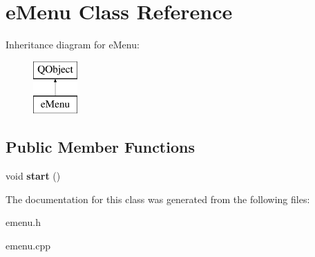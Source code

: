 \hypertarget{classe_menu}{}\section{e\+Menu Class Reference}
\label{classe_menu}
Inheritance diagram for e\+Menu\+:\begin{figure}[H]
\begin{center}
\leavevmode
\includegraphics[height=2.000000cm]{classe_menu}
\end{center}
\end{figure}
\subsection*{Public Member Functions}
\begin{DoxyCompactItemize}
\item 
void {\bfseries start} ()\hypertarget{classe_menu_aaf3437a2ac8b478cc955f5baf47edef8}{}\label{classe_menu_aaf3437a2ac8b478cc955f5baf47edef8}

\end{DoxyCompactItemize}


The documentation for this class was generated from the following files\+:\begin{DoxyCompactItemize}
\item 
emenu.\+h\item 
emenu.\+cpp\end{DoxyCompactItemize}
